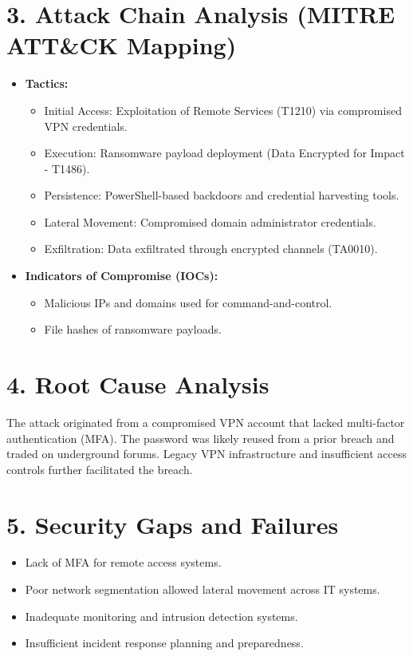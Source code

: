 \documentclass[11pt]{article}
\begin{document}
\section*{3. Attack Chain Analysis (MITRE ATT\&CK Mapping)}
\begin{itemize}[leftmargin=*]
    \item \textbf{Tactics:}
        \begin{itemize}
            \item Initial Access: Exploitation of Remote Services (T1210) via compromised VPN credentials.
            \item Execution: Ransomware payload deployment (Data Encrypted for Impact - T1486).
            \item Persistence: PowerShell-based backdoors and credential harvesting tools.
            \item Lateral Movement: Compromised domain administrator credentials.
            \item Exfiltration: Data exfiltrated through encrypted channels (TA0010).
        \end{itemize}
    \item \textbf{Indicators of Compromise (IOCs):}
        \begin{itemize}
            \item Malicious IPs and domains used for command-and-control.
            \item File hashes of ransomware payloads.
        \end{itemize}
\end{itemize}

\section*{4. Root Cause Analysis}
The attack originated from a compromised VPN account that lacked multi-factor authentication (MFA). The password was likely reused from a prior breach and traded on underground forums. Legacy VPN infrastructure and insufficient access controls further facilitated the breach.

\section*{5. Security Gaps and Failures}
\begin{itemize}[leftmargin=*]
    \item Lack of MFA for remote access systems.
    \item Poor network segmentation allowed lateral movement across IT systems.
    \item Inadequate monitoring and intrusion detection systems.
    \item Insufficient incident response planning and preparedness.
\end{itemize}
\end{document}
